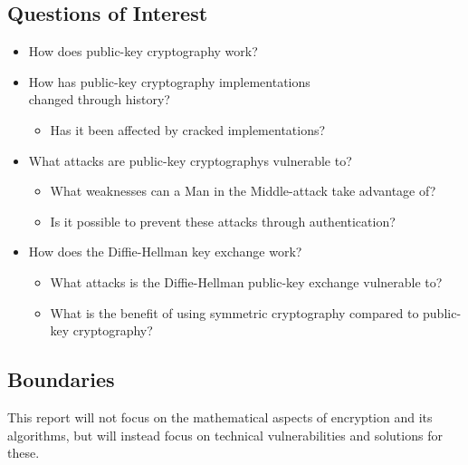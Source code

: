 \documentclass{acm_proc_article-sp}
\begin{document}
\subsection{Questions of Interest}
\begin{itemize} %
    \item How does public-key cryptography work? %
    \item How has public-key cryptography implementations\\ changed through history? %
    \begin{itemize}
        \item Has it been affected by cracked implementations?
    \end{itemize}
    \item What attacks are public-key cryptographys vulnerable to? %
    \begin{itemize} 
        \item What weaknesses can a Man in the Middle-attack take advantage of? %
        \item Is it possible to prevent these attacks through authentication? %
    \end{itemize}
    \item How does the Diffie-Hellman key exchange work? %
    \begin{itemize}
        \item What attacks is the Diffie-Hellman public-key exchange vulnerable to? %
        \item What is the benefit of using symmetric cryptography compared to public-key cryptography? %
    \end{itemize}
\end{itemize}

\subsection{Boundaries}
This report will not focus on the mathematical aspects of encryption and its algorithms, but will instead focus on technical vulnerabilities and  solutions for these. 
\end{document}
